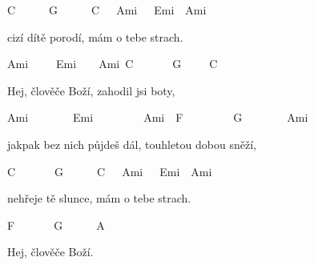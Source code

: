 C~~~~~~G~~~~~~C~~~Ami~~~Emi~~Ami

cizí dítě porodí, mám o tebe strach. 
 
\bigskip

Ami~~~~~Emi~~~~Ami~C~~~~~~~G~~~~~C 

Hej, člověče Boží, zahodil jsi boty, 

Ami~~~~~~~~Emi~~~~~~~~~Ami~~F~~~~~~~~~G~~~~~~~~Ami 

jakpak bez nich půjdeš dál, touhletou dobou sněží,

C~~~~~~~G~~~~~~C~~~Ami~~~Emi~~Ami

nehřeje tě slunce, mám o tebe strach.

\bigskip

F~~~~~~~G~~~~~~A

Hej, člověče Boží.